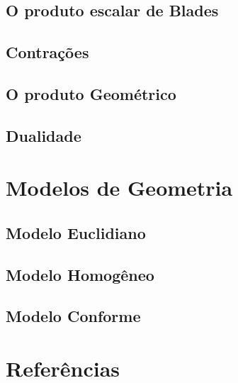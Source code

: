 \documentclass[10pt]{beamer}
\theoremstyle{plain}
\theoremstyle{definition}
\begin{document}
	
	\subsection{O produto escalar de Blades}
	
	
	\subsection{Contrações}
	
	\subsection{O produto Geométrico}
	
	\subsection{Dualidade}
	
	\section{Modelos de Geometria}
	
	\subsection{Modelo Euclidiano}
	
	\subsection{Modelo Homogêneo}
	
	\subsection{Modelo Conforme}
	
	
	\section{Referências}
	\begin{frame}		
		
		{\footnotesize
		
		}
	\end{frame}
	
\end{document}
